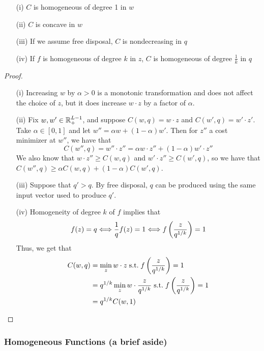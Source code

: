 \documentclass[12pt]{article}
\begin{document}
\begin{proposition}\label{prop:cost_fn_properties}
	
	\begin{itemize}
		\item[(i)] $C$ is homogeneous of degree 1 in $w$
		\item[(ii)] $C$ is concave in $w$
		\item[(iii)] If we assume free disposal, $C$ is nondecreasing in $q$
		\item[(iv)] If $f$ is homogeneous of degree $k$ in $z$, $C$ is homogeneous of degree $\frac{1}{k}$ in $q$
	\end{itemize}
\end{proposition}
\begin{proof}
	
	\begin{itemize}
		\item[(i)] Increasing $w$ by $\alpha > 0$ is a monotonic transformation and does not affect the choice of $z$, but it does increase $w \cdot z$ by a factor of $\alpha$.
		\item[(ii)] Fix $w,w' \in \mathbb{R}^{L-1}_+$, and suppose $C(w,q) = w \cdot z$ and $C(w',q) = w' \cdot z'$. Take $\alpha \in [0,1]$ and let $w'' = \alpha w + (1-\alpha)w'$. Then for $z''$ a cost minimizer at $w''$, we have that
		\[
		C(w'',q) = w'' \cdot z'' = \alpha w \cdot z'' + (1-\alpha)w' \cdot z''
		\]
		We also know that $w \cdot z'' \ge C(w,q)$ and $w'\cdot z'' \ge C(w',q)$, so we have that $C(w'',q) \ge \alpha C(w,q) + (1-\alpha)C(w',q)$.
		\item[(iii)] Suppose that $q' > q$. By free disposal, $q$ can be produced using the same input vector used to produce $q'$.
		\item[(iv)] Homogeneity of degree $k$ of $f$ implies that 
		\[
		f(z) = q \Longleftrightarrow \frac{1}{q} f(z) = 1 \Longleftrightarrow f\left( \frac{z}{q^{1/k}}\right) = 1
		\]
		Thus, we get that
		\begin{align*}
			C(w,q) &= \min_{z}w \cdot z \;\text{s.t.}\; f\left( \frac{z}{q^{1/k}}\right) = 1 \\
			&= q^{1/k} \min_z w \cdot \frac{z}{q^{1/k}} \;\text{s.t.}\; f\left( \frac{z}{q^{1/k}}\right) = 1  \\
			&= q^{1/k} C(w,1)
		\end{align*}
	\end{itemize}
\end{proof}

\subsubsection{Homogeneous Functions (a brief aside)}
\end{document}
